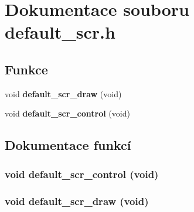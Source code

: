 \section{Dokumentace souboru default\_\-scr.h}
\label{default__scr_8h}
\subsection*{Funkce}
\begin{DoxyCompactItemize}
\item 
void {\bf default\_\-scr\_\-draw} (void)
\item 
void {\bf default\_\-scr\_\-control} (void)
\end{DoxyCompactItemize}


\subsection{Dokumentace funkcí}
\subsubsection[{default\_\-scr\_\-control}]{\setlength{\rightskip}{0pt plus 5cm}void default\_\-scr\_\-control (void)}\label{default__scr_8h_a959dd0c7a626e32bb9328e93fee4278d}
\subsubsection[{default\_\-scr\_\-draw}]{\setlength{\rightskip}{0pt plus 5cm}void default\_\-scr\_\-draw (void)}\label{default__scr_8h_a92943a1d6c25c652c6fcc1ba8b60861a}
